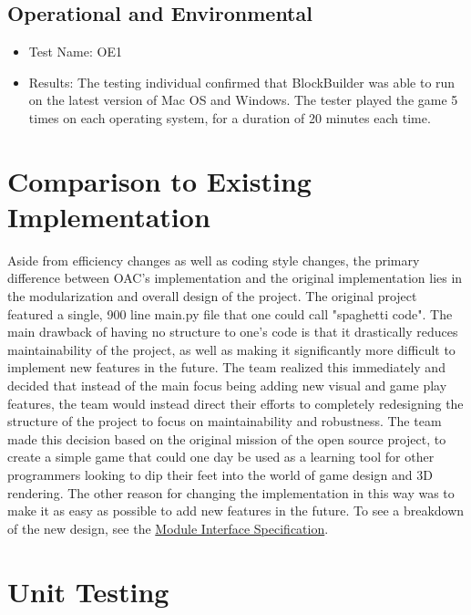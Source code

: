 \documentclass[12pt, titlepage]{article}
\begin{document}
\subsection{Operational and Environmental}

\begin{itemize}
    \item[] Test Name: OE1
    \item[] Results: The testing individual confirmed that BlockBuilder was able to run on the latest version of Mac OS and Windows. The tester played the game 5 times on each operating system, for a duration of 20 minutes each time.
\end{itemize}

	
\section{Comparison to Existing Implementation}	

Aside from efficiency changes as well as coding style changes, the primary difference between OAC's implementation and the original implementation lies in the modularization and overall design of the project. The original project featured a single, 900 line main.py file that one could call "spaghetti code". The main drawback of having no structure to one's code is that it drastically reduces maintainability of the project, as well as making it significantly more difficult to implement new features in the future. The team realized this immediately and decided that instead of the main focus being adding new visual and game play features, the team would instead direct their efforts to completely redesigning the structure of the project to focus on maintainability and robustness. The team made this decision based on the original mission of the open source project, to create a simple game that could one day be used as a learning tool for other programmers looking to dip their feet into the world of game design and 3D rendering. The other reason for changing the implementation in this way was to make it as easy as possible to add new features in the future. To see a breakdown of the new design, see the \href{https://gitlab.cas.mcmaster.ca/lucenta/3XA3/blob/master/Doc/Design/MIS/MIS.pdf}{Module Interface Specification}.


\section{Unit Testing}
\end{document}
